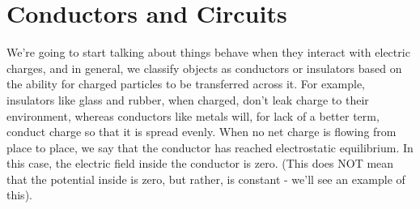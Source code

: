 \section{Conductors and Circuits}
We're going to start talking about things behave when they interact with electric charges, and in general, we classify objects as conductors or insulators based on the ability for charged particles to be transferred across it. For example, insulators like glass and rubber, when charged, don't leak charge to their environment, whereas conductors like metals will, for lack of a better term, conduct charge so that it is spread evenly. When no net charge is flowing from place to place, we say that the conductor has reached electrostatic equilibrium. In this case, the electric field inside the conductor is zero. (This does NOT mean that the potential inside is zero, but rather, is constant - we'll see an example of this). 

